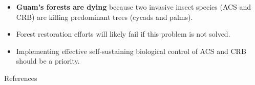 \documentclass[]{beamer}
\begin{document}
\begin{frame}
	\begin{itemize}
		\item \textbf{Guam's forests are dying} because two invasive insect species (ACS and CRB) are killing predominant trees (cycads and palms).
		\item Forest restoration efforts will likely fail if this problem is not solved.
		\item Implementing effective self-sustaining biological control of ACS and CRB should be a priority.
	\end{itemize}
\end{frame}

\begin{frame}{}
\end{frame}

\begin{frame}{References}
	\nocite{*}
	\printbibliography
\end{frame}
\end{document}
